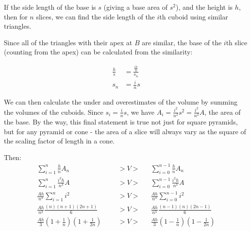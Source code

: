 \documentclass{article}
\begin{document}
If the side length of the base is $s$ (giving a base area of $s^2$), and the height is $h$, then for $n$ slices, we can find the side length of the $i$th cuboid using similar triangles. 

\begin{center}
\end{center}

Since all of the triangles with their apex at $B$ are similar, the base of the $i$th slice (counting from the apex) can be calculated from the similarity:

\begin{align*}
\frac{h}{s} &= \frac{\frac{ih}{n}}{s_n} \\
s_n &=\frac{i}{n}s 
\end{align*}

We can then calculate the under and overestimates of the volume by summing the volumes of the
cuboids. Since $s_i = \frac{i}{n}s$, we have $A_i = \frac{i^2}{n^2}s^2 = \frac{i^2}{n^2}A$,
the area of the base. By the way, this final statement is true not just for square pyramids, but
for any pyramid or cone - the area of a slice will always vary as the square of the scaling
factor of length in a cone.

Then:
\begin{align*}
	\sum_{i=1}^{n} \frac{h}{n}A_n &&&> V > &&\sum_{i=0}^{n-1} \frac{h}{n}A_n \\
	\sum_{i=1}^{n} \frac{i^2h}{n^3}A &&&> V > &&\sum_{i=0}^{n-1} \frac{i^2h}{n^3}A \\
	\frac{Ah}{n^3} \sum_{i=1}^{n} i^2 &&&> V > &&\frac{Ah}{n^3} \sum_{i=0}^{n-1} i^2 \\
	\frac{Ah}{n^3} \frac{(n)(n+1)(2n+1)}{6} &&& > V > &&\frac{Ah}{n^3} \frac{(n-1)(n)(2n-1)}{6} \\
	\frac{Ah}{3} (1+\frac{1}{n})(1+\frac{1}{2n}) &&&> V > &&\frac{Ah}{3} (1-\frac{1}{n})(1-\frac{1}{2n})
\end{align*}
\end{document}
